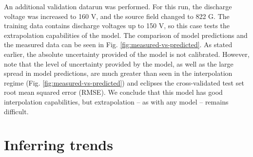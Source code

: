 
An additional validation datarun was performed. For this run, the discharge voltage was increased to 160 V, and the source field changed to 822 G. The training data contains discharge voltages up to 150 V, so this case tests the extrapolation capabilities of the model. The comparison of model predictions and the measured data can be seen in Fig. \ref{fig:measured-vs-predicted}. As stated earlier, the absolute uncertainty provided of the model is not calibrated. However, note that the level of uncertainty provided by the model, as well as the large spread in model predictions, are much greater than seen in the interpolation regime (Fig. \ref{fig:measured-vs-predicted}) and eclipses the cross-validated test set root mean squared error (RMSE). We conclude that this model has good interpolation capabilities, but extrapolation -- as with any model -- remains difficult.



\section{Inferring trends}
\label{sec:trends}

